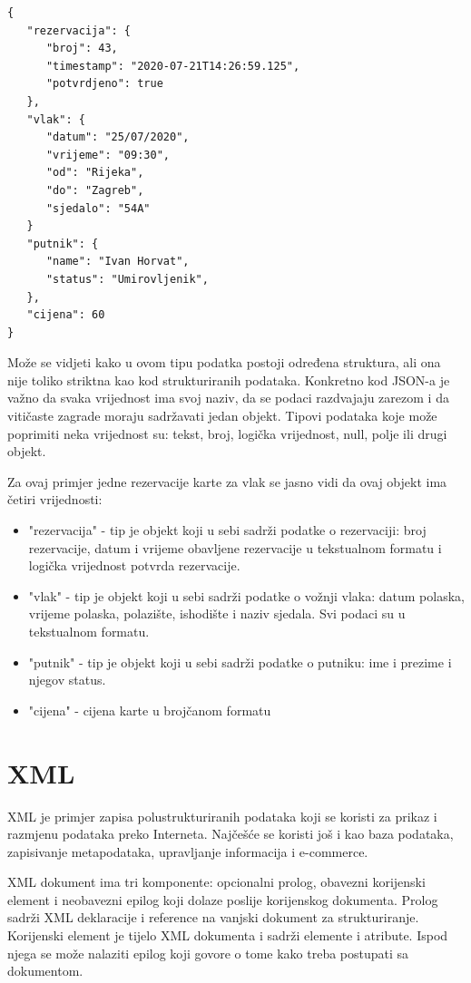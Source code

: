 \documentclass{foi}
\begin{document}
\begin{lstlisting}
{
   "rezervacija": {
      "broj": 43,
      "timestamp": "2020-07-21T14:26:59.125",
      "potvrdjeno": true
   },
   "vlak": {
      "datum": "25/07/2020",
      "vrijeme": "09:30",
      "od": "Rijeka",
      "do": "Zagreb",
      "sjedalo": "54A"
   }
   "putnik": {
      "name": "Ivan Horvat",
      "status": "Umirovljenik",
   },
   "cijena": 60
}
\end{lstlisting}

Može se vidjeti kako u ovom tipu podatka postoji određena struktura, ali ona nije toliko striktna kao kod strukturiranih podataka. Konkretno kod JSON-a je važno da svaka vrijednost ima svoj naziv, da se podaci razdvajaju zarezom i da vitičaste zagrade moraju sadržavati jedan objekt. Tipovi podataka koje može poprimiti neka vrijednost su: tekst, broj, logička vrijednost, null,  polje ili drugi objekt. 

Za ovaj primjer jedne rezervacije karte za vlak se jasno vidi da ovaj objekt ima četiri vrijednosti:

\begin{itemize}
\item "rezervacija" - tip je objekt koji u sebi sadrži podatke o rezervaciji: broj rezervacije, datum i vrijeme obavljene rezervacije u tekstualnom formatu i logička vrijednost potvrda rezervacije.
\item "vlak" - tip je objekt koji u sebi sadrži podatke o vožnji vlaka: datum polaska, vrijeme polaska, polazište, ishodište i naziv sjedala. Svi podaci su u tekstualnom formatu.
\item "putnik" - tip je objekt koji u sebi sadrži podatke o putniku: ime i prezime i njegov status.
\item "cijena" -  cijena karte u brojčanom formatu
\end{itemize}

\chapter{XML}

XML je primjer zapisa polustrukturiranih podataka koji se koristi za prikaz i razmjenu podataka preko Interneta. Najčešće se koristi još i kao baza podataka, zapisivanje metapodataka, upravljanje informacija i e-commerce. 

XML dokument ima tri komponente: opcionalni prolog, obavezni korijenski element i neobavezni epilog koji dolaze poslije korijenskog dokumenta. Prolog sadrži XML deklaracije i reference na vanjski dokument za strukturiranje. Korijenski element je tijelo XML dokumenta i sadrži elemente i atribute. Ispod njega se može nalaziti epilog koji govore o tome kako treba postupati sa dokumentom. \cite{xmlDatabase}
\end{document}
